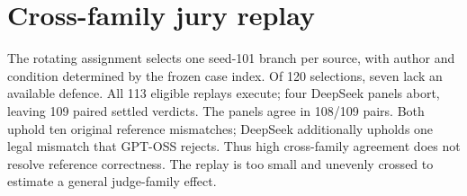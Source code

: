 \clearpage
\section{Cross-family jury replay}
\label{app:judge-sensitivity}
The rotating assignment selects one seed-101 branch per source, with author
and condition determined by the frozen case index. Of 120 selections, seven
lack an available defence. All 113 eligible replays execute; four DeepSeek
panels abort, leaving 109 paired settled verdicts. The panels agree in 108/109
pairs. Both uphold ten original reference mismatches; DeepSeek additionally
upholds one legal mismatch that GPT-OSS rejects. Thus high cross-family
agreement does not resolve reference correctness. The replay is too small and
unevenly crossed to estimate a general judge-family effect.

\begin{table}[htbp]
 \centering\small\setlength{\tabcolsep}{3pt}
 
 \caption{Matched frozen-defence replay. Each domain has 30 planned
 selections. Paired counts require settled verdicts from both panels.
 The last columns condition on initial reference mismatches within those
 pairs, using the audited sensitivity. GPT is the common GPT-OSS panel;
 DS is the DeepSeek replay. These are panels over the same sources, not
 additional independent tasks.}
 \label{tab:sector-jury-replay}
\end{table}
